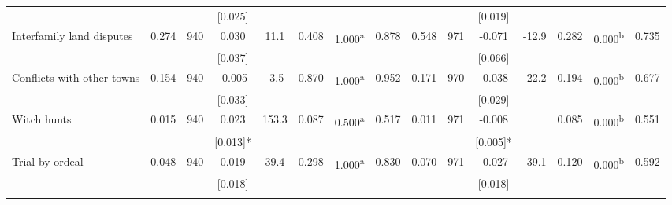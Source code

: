 \begin{tabular}{lcccccccccccccc}
 &  &  & [0.025] &  &  &  &  &  &  & [0.019] &  &  &  & \\
\quad Interfamily land disputes & 0.274 & 940 & 0.030 & 11.1 & 0.408 & 1.000\textsuperscript{a} & 0.878 & 0.548 & 971 & -0.071 & -12.9 & 0.282 & 0.000\textsuperscript{b} & 0.735\\
 &  &  & [0.037] &  &  &  &  &  &  & [0.066] &  &  &  & \\
\quad Conflicts with other towns & 0.154 & 940 & -0.005 & -3.5 & 0.870 & 1.000\textsuperscript{a} & 0.952 & 0.171 & 970 & -0.038 & -22.2 & 0.194 & 0.000\textsuperscript{b} & 0.677\\
 &  &  & [0.033] &  &  &  &  &  &  & [0.029] &  &  &  & \\
\quad Witch hunts & 0.015 & 940 & 0.023 & 153.3 & 0.087 & 0.500\textsuperscript{a} & 0.517 & 0.011 & 971 & -0.008 &  & 0.085 & 0.000\textsuperscript{b} & 0.551\\
 &  &  & [0.013]* &  &  &  &  &  &  & [0.005]* &  &  &  & \\
\quad Trial by ordeal & 0.048 & 940 & 0.019 & 39.4 & 0.298 & 1.000\textsuperscript{a} & 0.830 & 0.070 & 971 & -0.027 & -39.1 & 0.120 & 0.000\textsuperscript{b} & 0.592\\
 &  &  & [0.018] &  &  &  &  &  &  & [0.018] &  &  &  & \\
\noalign{\smallskip}\hline\end{tabular}
